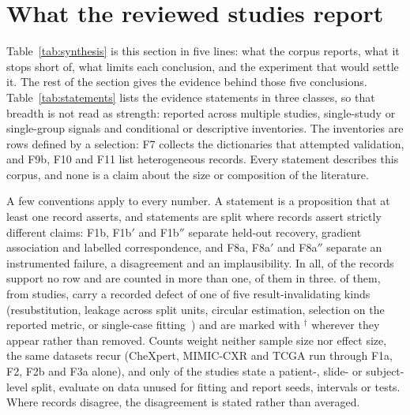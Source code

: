 \section{What the reviewed studies report}
\label{sec:findings}







Table~\ref{tab:synthesis} is this section in five lines: what the corpus reports, what it stops short
of, what limits each conclusion, and the experiment that would settle it. The rest of the section gives
the evidence behind those five conclusions. Table~\ref{tab:statements} lists the \Fnrows{} evidence
statements in three classes, so that breadth is not read as strength: \Fnmulti{} reported across
multiple studies, \Fnsingle{} single-study or single-group signals and \Fncond{} conditional or
descriptive inventories. The inventories are rows defined by a selection: F7 collects the dictionaries
that attempted validation, and F9b, F10 and F11 list heterogeneous records. Every statement describes
this corpus, and none is a claim about the size or composition of the literature.

A few conventions apply to every number. A statement is a proposition that at least one record asserts,
and statements are split where records assert strictly different claims: F1b, F1b$'$ and F1b$''$
separate held-out recovery, gradient association and labelled correspondence, and F8a, F8a$'$ and
F8a$''$ separate an instrumented failure, a disagreement and an implausibility. In all, of the \Nclaims{}
records \Fnorow{} support no row and \Fmultirow{} are counted in more than one, \Fmultithree{} of them
in three. \Fflagrec{} of them, from \Fdefstud{} studies, carry a recorded defect of one of five
result-invalidating kinds (resubstitution, leakage across split units, circular estimation, selection on
the reported metric, or single-case fitting~\cite{kapoor2023leakage}) and are marked with $^{\dagger}$
wherever they appear rather than removed. Counts weight neither sample size nor effect size, the same
datasets recur (CheXpert, MIMIC-CXR and TCGA run through F1a, F2, F2b and F3a alone), and only
\Nminvalid{} of the \Ncore{} studies state a patient-, slide- or subject-level split, evaluate on data
unused for fitting and report seeds, intervals or tests. Where records disagree, the disagreement is
stated rather than averaged.

